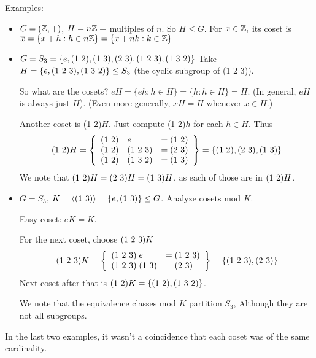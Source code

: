 \documentclass[notes.tex]{subfiles}
\begin{document}
Examples:
\begin{itemize}
	\item $G = (\mathbb{Z}, +)$, $H = n\mathbb{Z} = $ multiples of $n$.
	So $H\le G$. For $x\in\mathbb{Z},$ its coset is $\overline{x} = \{x+h:h\in n\mathbb{Z}\} = \{x + nk:k\in\mathbb{Z}\}$
	\item $G = S_3 = \{e, \text{(1 2)}, \text{(1 3)}, \text{(2 3)}, \text{(1 2 3)}, \text{(1 3 2)}\}$
	Take $H = \{e, \text{(1 2 3)}, \text{(1 3 2)}\} \le S_3$ (the cyclic subgroup of (1 2 3)).

	So what are the cosets? $eH = \{eh: h\in H\} = \{h : h \in H\} = H$. 
	(In general, $eH$ is always just $H$). (Even more generally, $xH = H$ whenever $x\in H$.)

	Another coset is (1 2)$H$.
	Just compute (1 2)$h$ for each $h\in H$.
	Thus \[
		\text{(1 2)}H = \left\{
		\begin{array}{rll}
		 	\text{(1 2)}&e &= \text{(1 2)}\\
			\text{(1 2)}&\text{(1 2 3)} &= \text{(2 3)}\\
			\text{(1 2)}&\text{(1 3 2)} &= \text{(1 3)}\\
		 \end{array} 
		 \right\} = \{\text{(1 2)}, \text{(2 3)}, \text{(1 3)}\}
	\]
	We note that $\text{(1 2)}H = \text{(2 3)}H = \text{(1 3)}H$, as each of those
	are in $\text{(1 2)}H$.


	\item
	$G = S_3$, $K = \langle\text{(1 3)}\rangle  = \{e, \text{(1 3)}\} \le G$.
	Analyze cosets mod $K$.

	Easy coset: $eK = K$.

	For the next coset, choose $\text{(1 2 3)}K$
	\[
		\text{(1 2 3)}K = \left\{
		\begin{array}{ll}
		 	\text{(1 2 3)} \;e &= \text{(1 2 3)}\\
			\text{(1 2 3)} \;\text{(1 3)} &= \text{(2 3)}\\
		 \end{array} 
		 \right\} = \{\text{(1 2 3)}, \text{(2 3)}\}
	\]
	Next coset after that is  $\text{(1 2)}K = \{\text{(1 2)}, \text{(1 3 2)}\}$.

	We note that the equivalence classes mod $K$ partition $S_3$, Although they are not all subgroups.
\end{itemize}

In the last two examples, it wasn't a coincidence that each coset was of the same cardinality.
\end{document}
